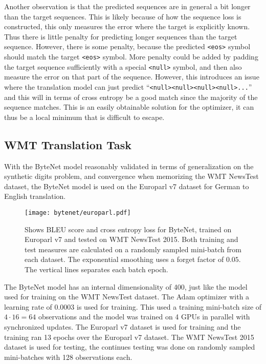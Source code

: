 Another observation is that the predicted sequences are in general a bit longer than the target sequences. This is likely because of how the sequence loss is constructed, this only measures the error where the target is explicitly known. Thus there is little penalty for predicting longer sequences than the target sequence. However, there is some penalty, because the predicted \texttt{<eos>} symbol should match the target \texttt{<eos>} symbol. More penalty could be added by padding the target sequence sufficiently with a special \texttt{<null>} symbol, and then also measure the error on that part of the sequence. However, this introduces an issue where the translation model can just predict ``\texttt{<null><null><null><null>...}'' and this will in terms of cross entropy be a good match since the majority of the sequence matches. This is an easily obtainable solution for the optimizer, it can thus be a local minimum that is difficult to escape.

\clearpage
\subsection{WMT Translation Task}

With the ByteNet model reasonably validated in terms of generalization on the synthetic digits problem, and convergence when memorizing the WMT NewsTest dataset, the ByteNet model is used on the Europarl v7 dataset for German to English translation.

\begin{figure}[h]
    \centering
    \texttt{[image: bytenet/europarl.pdf]}
    \caption{Shows BLEU score and cross entropy loss for ByteNet, trained on Europarl v7 and tested on WMT NewsTest 2015. Both training and test measures are calculated on a randomly sampled mini-batch from each dataset. The exponential smoothing uses a forget factor of $0.05$. The vertical lines separates each batch epoch.}
    \label{fig:result:bytenet:europarl}
\end{figure}

The ByteNet model has an internal dimensionality of 400, just like the model used for training on the WMT NewsTest dataset. The Adam optimizer with a learning rate of 0.0003 is used for training. This used a training mini-batch size of $4 \cdot 16 = 64$ observations and the model was trained on 4 GPUs in parallel with synchronized updates. The Europarl v7 dataset is used for training and the training ran 13 epochs over the Europarl v7 dataset. The WMT NewsTest 2015 dataset is used for testing, the continues testing was done on randomly sampled mini-batches with 128 observations each.

